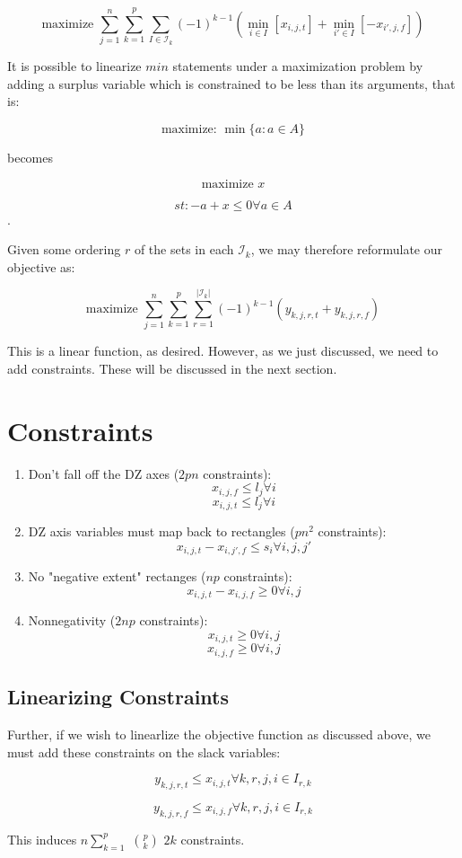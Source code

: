 \documentclass[a4paper]{article}
\begin{document}
$$\textrm{maximize }\sum_{j=1}^n\sum_{k=1}^{p} \sum_{I \in \mathcal{I}_k} 
(-1)^{k-1}(\min_{i \in I} [x_{i,j,t}] + \min_{i' \in I} [-x_{i',j,f}])$$

It is possible to linearize $min$ statements under a maximization problem by adding a surplus variable which is constrained to be less than its arguments, that is:

$$\textrm{maximize: } \min\{a : a \in A\}$$

becomes

$$\textrm{maximize } x$$

$$st: - a + x \leq 0 \forall a \in A$$.

Given some ordering $r$ of the sets in each $\mathcal{I}_k$, we may therefore reformulate our objective as:


$$\textrm{maximize }\sum_{j=1}^n\sum_{k=1}^{p} \sum_{r=1}^{|\mathcal{I}_k|}
(-1)^{k-1} (y_{k,j,r,t} + y_{k,j,r,f})$$

This is a linear function, as desired. However, as we just discussed, we need to add constraints. These will be discussed in the next section.

\section{Constraints}

\begin{enumerate}
    \item Don't fall off the DZ axes ($2pn$ constraints):
        $$x_{i,j,f} \leq l_j \forall i$$
        $$x_{i,j,t} \leq l_j \forall i$$
    \item DZ axis variables must map back to rectangles ($pn^2$ constraints):
        $$x_{i,j,t} - x_{i,j',f} \leq s_i \forall i,j,j'$$
    \item No "negative extent" rectanges ($np$ constraints):
        $$x_{i,j,t} - x_{i,j,f} \geq 0 \forall i,j$$
    \item Nonnegativity ($2np$ constraints):
        $$x_{i,j,t} \geq 0 \forall i,j$$
        $$x_{i,j,f} \geq 0 \forall i,j$$
\end{enumerate}

\subsection{Linearizing Constraints}

Further, if we wish to linearlize the objective function as discussed above, we must add these constraints on the slack variables:

$$y_{k,j,r,t} \leq x_{i,j,t} \forall k,r,j,i \in I_{r,k}$$

$$y_{k,j,r,f} \leq x_{i,j,f} \forall k,r,j,i \in I_{r,k}$$

This induces $n \sum_{k=1}^{p}$ ${p}\choose{k}$ $2k$ constraints.
\end{document}
